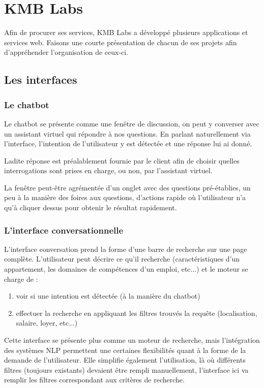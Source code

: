 \documentclass[12pt,a4paper,twoside]{scrreprt}
\begin{document}
\chapter{KMB Labs}
Afin de procurer ses services, KMB Labs a développé plusieurs applications et services web. Faisons une courte présentation de chacun de ses projets afin d'appréhender l'organisation de ceux-ci.

\section{Les interfaces}
\subsection{Le chatbot}

Le chatbot se présente comme une fenêtre de discussion, on peut y converser avec un assistant virtuel qui répondre à nos questions. En parlant naturellement via l'interface, l'intention de l'utilisateur y est détectée et une réponse lui ai donné.

Ladite réponse est préalablement fournie par le client afin de choisir quelles interrogations sont prises en charge, ou non, par l'assistant virtuel.

La fenêtre peut-être agrémentée d'un onglet avec des questions pré-établies, un peu à la manière des foires aux questions, d'actions rapide où l'utilisateur n'a qu'à cliquer dessus pour obtenir le résultat rapidement.

\subsection{L'interface conversationnelle}
L'interface conversation prend la forme d'une barre de recherche sur une page complète. L'utilisateur peut décrire ce qu'il recherche (caractéristiques d'un appartement, les domaines de compétences d'un emploi, etc...) et le moteur se charge de :
\begin{enumerate}
	\item voir si une intention est détectée (à la manière du chatbot)
	\item effectuer la recherche en appliquant les filtres trouvés la requête (localisation, salaire, loyer, etc...)
\end{enumerate}

Cette interface se présente plus comme un moteur de recherche, mais l'intégration des systèmes NLP permettent une certaines flexibilités quant à la forme de la demande de l'utilisateur. Elle simplifie également l'utilisation, là où différents filtres (toujours existants) devaient être rempli manuellement, l'interface ici va remplir les filtres correspondant aux critères de recherche.
\end{document}
